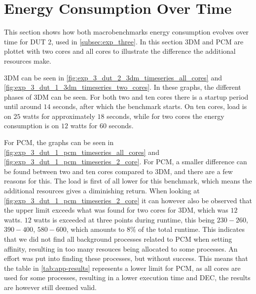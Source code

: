 \section{Energy Consumption Over Time}\label{app:timeseries}

This section shows how both macrobenchmarks energy consumption evolves over time for DUT 2, used in \cref{subsec:exp_three}. In this section 3DM and PCM are plottet with two cores and all cores to illustrate the difference the additional resources make. 

3DM can be seen in \cref{fig:exp_3_dut_2_3dm_timeseries_all_cores} and \cref{fig:exp_3_dut_1_3dm_timeseries_two_cores}. In these graphs, the different phases of 3DM can be seen. For both two and ten cores there is a startup period until around $14$ seconds, after which the benchmark starts. On ten cores, load is on $25$ watts for approximately $18$ seconds, while for two cores the energy consumption is on $12$ watts for $60$ seconds. 




For PCM, the graphs can be seen in \cref{fig:exp_3_dut_1_pcm_timeseries_all_cores} and \cref{fig:exp_3_dut_1_pcm_timeseries_2_core}. For PCM, a smaller difference can be found between two and ten cores compared to 3DM, and there are a few reasons for this. The load is first of all lower for this benchmark, which means the additional resources gives a diminishing return. When looking at \cref{fig:exp_3_dut_1_pcm_timeseries_2_core} it can however also be observed that the upper limit exceeds what was found for two cores for 3DM, which was $12$ watts. $12$ watts  is exceeded at three points during runtime, this being $230-260$, $390-400$, $580-600$, which amounts to $8\%$ of the total runtime. This indicates that we did not find all background processes related to PCM when setting affinity, resulting in too many resouces being allocated to some processes. An effort was put into finding these processes, but without success. This means that the table in \cref{tab:app-results} represents a lower limit for PCM, as all cores are used for some processes, resulting in a lower execution time and DEC, the results are however still deemed valid.


